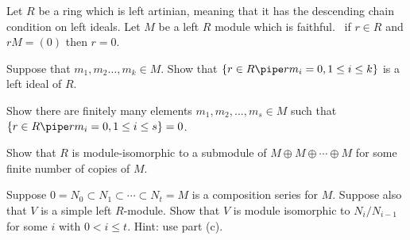 Let $R$ be a ring which is left artinian, meaning that it has the
descending chain condition on left ideals. Let $M$ be a left $R$
module which is faithful. \Ie\ if $r\in R$ and $rM=(0)$ then $r=0$.
\begin{alist}
\item Suppose that $m_1,m_2\ldots ,m_k\in M$. Show that $\{r\in R\pipe
r m_i=0, 1\leq i\leq k\}$ is a left ideal of $R$.
\item Show there are finitely many elements $m_1,m_2,\ldots ,m_s\in M$
such that $\{r\in R\pipe rm_i=0,1\leq i\leq s\}=0$.
\item Show that $R$ is module-isomorphic to a submodule of $M\oplus
M\oplus \cdots \oplus M$ for some finite number of copies of $M$.
\item Suppose $0=N_0\subset N_1\subset \cdots \subset N_t=M$ is a
composition series for $M$. Suppose also that $V$ is a simple left
$R$-module. Show that $V$ is module isomorphic to $N_i/N_{i-1}$ for
some $i$ with $0<i\leq t$. Hint: use part (c). 
\end{alist}
